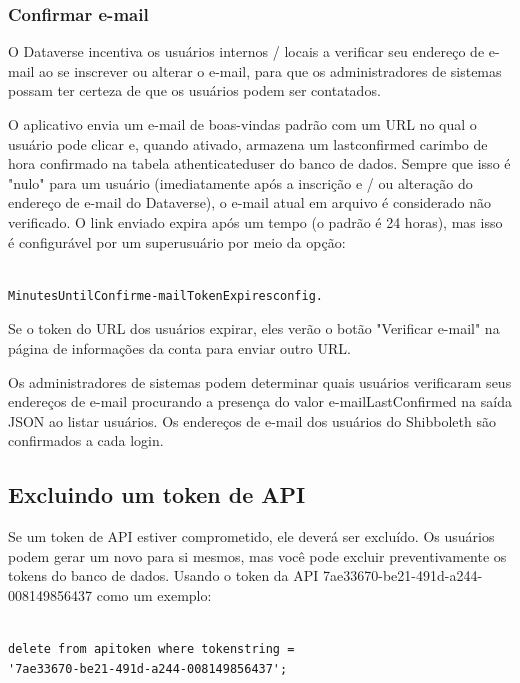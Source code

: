 \documentclass[12pt,hidelinks]{article}
\begin{document}
\subsubsection{Confirmar e-mail}

\qquad O Dataverse incentiva os usuários internos / locais a verificar seu endereço de e-mail ao se inscrever ou alterar o e-mail, para que os administradores de sistemas possam ter certeza de que os usuários podem ser contatados.

O aplicativo envia um e-mail de boas-vindas padrão com um URL no qual o usuário pode clicar e, quando ativado, armazena um lastconfirmed carimbo de hora confirmado na tabela athenticateduser do banco de dados. Sempre que isso é "nulo" para um usuário (imediatamente após a inscrição e / ou alteração do endereço de e-mail do Dataverse), o e-mail atual em arquivo é considerado não verificado. O link enviado expira após um tempo (o padrão é 24 horas), mas isso é configurável por um superusuário por meio da opção:

\begin{verbatim}

MinutesUntilConfirme-mailTokenExpiresconfig.

\end{verbatim}

Se o token do URL dos usuários expirar, eles verão o botão "Verificar e-mail" na página de informações da conta para enviar outro URL.

Os administradores de sistemas podem determinar quais usuários verificaram seus endereços de e-mail procurando a presença do valor e-mailLastConfirmed na saída JSON ao listar usuários. Os endereços de e-mail dos usuários do Shibboleth são confirmados a cada login.

\subsection{Excluindo um token de API}

\qquad Se um token de API estiver comprometido, ele deverá ser excluído. Os usuários podem gerar um novo para si mesmos, mas você pode excluir preventivamente os tokens do banco de dados. Usando o token da API 7ae33670-be21-491d-a244-008149856437 como um exemplo:

\begin{verbatim}

delete from apitoken where tokenstring = 
'7ae33670-be21-491d-a244-008149856437';

\end{verbatim}
\end{document}
